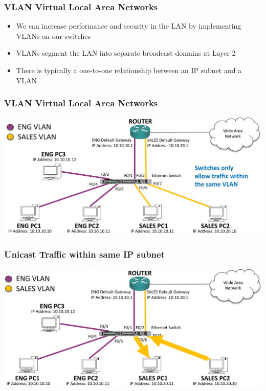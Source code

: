 \documentclass[pdflatex,compress,mathserif]{beamer}
\begin{document}
\begin{frame}
	\frametitle{VLAN Virtual Local Area Networks}
	\begin{itemize}
		\item We can increase performance and security in the LAN by implementing
VLANs on our switches
		\item VLANs segment the LAN into separate broadcast domains at Layer 2
		\item There is typically a one-to-one relationship between an IP subnet and
a VLAN
	\end{itemize}
\end{frame}

\begin{frame}
	\frametitle{VLAN Virtual Local Area Networks}
	\begin{center}
		\includegraphics[width=\linewidth]{img/img14}
	\end{center}
\end{frame}

\begin{frame}
	\frametitle{Unicast Traffic within same IP subnet}
	\begin{center}
		\includegraphics[width=\linewidth]{img/img15}
	\end{center}
\end{frame}
\end{document}
